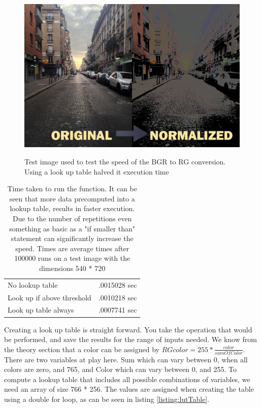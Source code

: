 \begin{center}
	\begin{multicols}{2}

	\begin{figure}[H]
	\includegraphics[width=1\linewidth]{figure/Analysis/Normalized.png}
	\label{rgConversion}
	\caption{Test image used to test the speed of the BGR to RG conversion. Using a look up table halved it execution time}
	\end{figure}

    \columnbreak
	\begin{table}[H]
		\centering
		\begin{tabular}{ l | l }
			\hline			
			No lookup table & .0015028 sec\\
			Look up if above threshold & .0010218 sec\\
			Look up table always& .0007741 sec\\
			\hline 
		\end{tabular}
	\caption{Time taken to run the function. It can be seen that more data precomputed into a lookup table, results in faster execution. Due to the number of repetitions even something as basic as a "if smaller than" statement can significantly increase the speed. Times are average times after 100000 runs on a test image with the dimensions 540 * 720}
	\label{table:rgConvSpeed}
	\end{table}
\end{multicols}

\end{center}
Creating a look up table is straight forward. You take the operation that would be performed, and save the results for the range of inputs needed. We know from the theory section that a color can be assigned by $RGcolor = 255 * \frac{color}{sumOfColor}$. There are two variables at play here. Sum which can vary between 0, when all colors are zero, and 765, and Color which can vary between 0, and 255. To compute a lookup table  that includes all possible combinations of variables, we need an array of size 766 * 256. The values are assigned when creating the table using a double for loop, as can be seen in listing \ref{listing:lutTable}.
